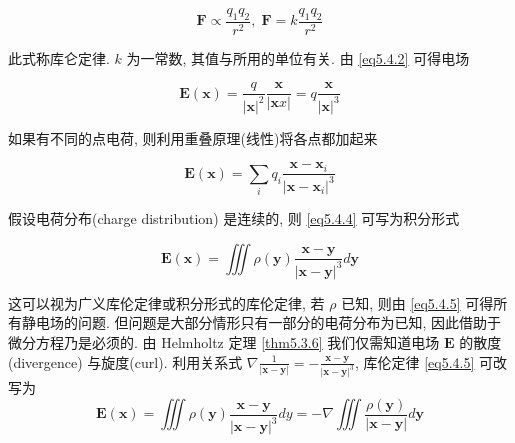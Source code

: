 \documentclass[11pt]{article}
\begin{document}
\begin{equation}
\boldsymbol{F} \propto \frac{{{q_1}{q_2}}}{{{r^2}}},\;\boldsymbol{F} = k\frac{{{q_1}{q_2}}}{{{r^2}}}
\label{eq5.4.2}
\end{equation}

此式称库仑定律. $ k $ 为一常数, 其值与所用的单位有关. 由 \ref{eq5.4.2} 可得电场

\begin{equation}
\boldsymbol{E}\left( \boldsymbol{x} \right) = \frac{q}{{{{\left| \boldsymbol{x} \right|}^2}}}\frac{\boldsymbol{x}}{{\left| \boldsymbol{x}x \right|}} = q\frac{\boldsymbol{x}}{{{{\left| \boldsymbol{x} \right|}^3}}}
\label{eq5.4.3}
\end{equation}

如果有不同的点电荷, 则利用重叠原理(线性)将各点都加起来

\begin{equation}
\boldsymbol{E}\left( \boldsymbol{x} \right) = \sum\limits_i {{q_i}\frac{{\boldsymbol{x} - {\boldsymbol{x}_i}}}{{{{\left| {\boldsymbol{x} - {\boldsymbol{x}_i}} \right|}^3}}}} 
\label{eq5.4.4}
\end{equation}

假设电荷分布(charge distribution) 是连续的, 则 \ref{eq5.4.4} 可写为积分形式

\begin{equation}
\boldsymbol{E}\left( \boldsymbol{x} \right) = \iiint {\rho \left( \boldsymbol{y} \right)\frac{{\boldsymbol{x} - \boldsymbol{y}}}{{{{\left| {\boldsymbol{x} - \boldsymbol{y}} \right|}^3}}}d\boldsymbol{y}}
\label{eq5.4.5}
\end{equation}

这可以视为广义库伦定律或积分形式的库伦定律, 若 $ \rho $ 已知, 则由 \ref{eq5.4.5} 可得所有静电场的问题. 但问题是大部分情形只有一部分的电荷分布为已知, 因此借助于微分方程乃是必须的. 由  Helmholtz 定理 \ref{thm5.3.6} 我们仅需知道电场 $ \boldsymbol{E} $ 的散度(divergence) 与旋度(curl). 利用关系式 $\nabla \frac{1}{{\left| {\boldsymbol{x} - \boldsymbol{y}} \right|}} =  - \frac{{\boldsymbol{x} - \boldsymbol{y}}}{{{{\left| {\boldsymbol{x} - \boldsymbol{y}} \right|}^3}}}$, 库伦定律 \ref{eq5.4.5} 可改写为
\begin{equation}
\boldsymbol{E}\left( \boldsymbol{x} \right) = \iiint {\rho \left( \boldsymbol{y} \right)\frac{{\boldsymbol{x} - \boldsymbol{y}}}{{{{\left| {\boldsymbol{x} - \boldsymbol{y}} \right|}^3}}}dy} =  - \nabla \iiint {\frac{{\rho \left( \boldsymbol{y} \right)}}{{\left| {\boldsymbol{x} - \boldsymbol{y}} \right|}}d\boldsymbol{y}}
\label{eq5.4.6}
\end{equation}
\end{document}
